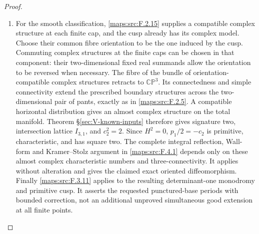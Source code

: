 \documentclass[11pt,a4paper]{article}
\theoremstyle{definition}
\begin{document}
\begin{proof}
\begin{enumerate}[label=\arabic*.]
\item For the smooth classification, \ref{maps:src:F.2.15} supplies a
compatible complex structure at each finite cap, and
the cusp already has its complex model.
Choose their common fibre orientation to be the one
induced by the cusp.
Commuting complex structures at the finite caps can
be chosen in that component: their two-dimensional
fixed real summands allow the orientation to be
reversed when necessary.
The fibre of the bundle of orientation-compatible
complex structures retracts to $\mathbb{CP}^3$.
Its connectedness and simple connectivity extend
the prescribed boundary structures across the
two-dimensional pair of pants, exactly as in \ref{maps:src:F.2.5}.
A compatible horizontal distribution gives an
almost complex structure on the total manifold.
Theorem \S\ref{sec:V-known-inputs} therefore gives signature two,
intersection lattice $I_{3,1}$, and $c_2^2=2$.
Since $H^2=0$, $p_1/2=-c_2$ is primitive,
characteristic, and has square two.
The complete integral reflection, Wall-form and Kramer--Stolz argument in \ref{maps:src:F.4.1}
depends only on these almost complex characteristic
numbers and three-connectivity.
It applies without alteration and gives the claimed
exact oriented diffeomorphism.
Finally \ref{maps:src:F.3.11} applies to the resulting determinant-one
monodromy and primitive cusp.
It asserts the requested punctured-base periods with
bounded correction, not an additional unproved
simultaneous good extension at all finite points.

\end{enumerate}
\end{proof}
\end{document}
